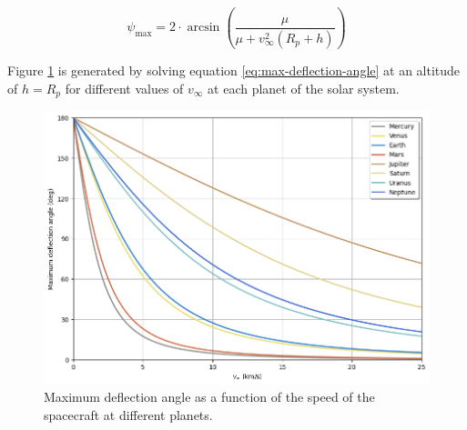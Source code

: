 \begin{equation}
        \psi_{\max} = 2 \cdot \arcsin{\left(\frac{\mu}{\mu + {v}^{2}_{\infty}(R_p + h)}\right)}
    \label{eq:max-deflection-angle}
\end{equation}

Figure \ref{fig:deflection-angle-at-speed} is generated by solving equation
\ref{eq:max-deflection-angle} at an altitude of $h = R_p$ for different values
of $v_{\infty}$ at each planet of the solar system.

\begin{figure}[H]
    \centering
    \includegraphics[width=\textwidth]{fig/static/deflection_angle.png}
    \caption[Maximum deflection angle as a function of the speed of the spacecraft at different planets.]{Maximum deflection angle as a function of the speed of the spacecraft at different planets.}
    \label{fig:deflection-angle-at-speed}
\end{figure}
